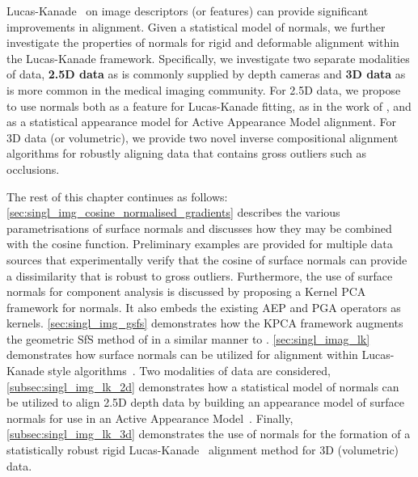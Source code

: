 Lucas-Kanade~\cite{lucas1981iterative} on image descriptors (or features) can
provide significant improvements in alignment. Given a statistical model
of normals, we further investigate the properties of normals for rigid and
deformable alignment within the Lucas-Kanade framework. Specifically, we
investigate two separate modalities of data, \textbf{2.5D data} as is
commonly supplied by depth cameras and \textbf{3D data} as is more common
in the medical imaging community. For 2.5D data, we propose to use normals both
as a feature for Lucas-Kanade fitting, as in the work of
\citet{antonakos2015feature}, and as a statistical appearance model for Active
Appearance Model alignment. For 3D data (or volumetric), we provide two novel
inverse compositional alignment~\cite{baker2004lucas} algorithms for robustly
aligning data that contains gross outliers such as occlusions.

The rest of this chapter continues as follows:
\cref{sec:singl_img_cosine_normalised_gradients} describes the various
parametrisations of surface normals and discusses how they may be combined with
the cosine function. Preliminary examples are provided for multiple
data sources that experimentally verify that the cosine of surface normals
can provide a dissimilarity that is robust to gross outliers. Furthermore,
the use of surface normals for component analysis is discussed by proposing a
Kernel PCA framework for normals. It also embeds the existing AEP and PGA
operators as kernels.
\cref{sec:singl_img_gsfs} demonstrates how the KPCA framework augments
the geometric SfS method of \citet{worthington1999new} in a similar manner to
\citet{smith2006recovering}.
\cref{sec:singl_imag_lk} demonstrates how surface
normals can be utilized for alignment within Lucas-Kanade style
algorithms~\cite{lucas1981iterative}. Two modalities of data are considered,
\cref{subsec:singl_img_lk_2d} demonstrates how a statistical model of normals
can be utilized to align 2.5D depth data by building an appearance model of
surface normals for use in an Active Appearance Model~\cite{cootes2001active}.
Finally, \cref{subsec:singl_img_lk_3d} demonstrates the use of normals for the
formation of a statistically robust rigid Lucas-Kanade~\cite{lucas1981iterative}
alignment method for 3D (volumetric) data.
{





}
\stopcontents[chapters]
